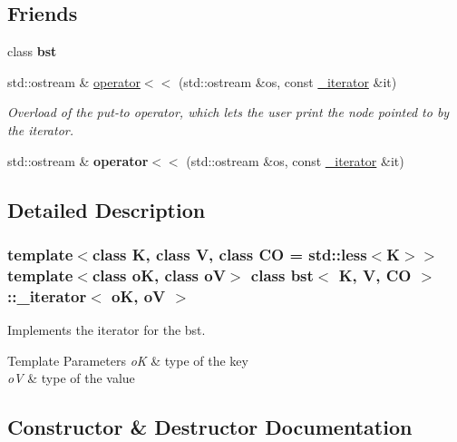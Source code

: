 \subsection*{Friends}
\begin{DoxyCompactItemize}
\item 
\mbox{\label{classbst_1_1__iterator_a6527b7edd158a9d9568888a83a53c54e}} 
class {\bfseries bst}
\item 
std\+::ostream \& \hyperlink{classbst_1_1__iterator_a517e7799c21cf88ce23e54c7f3f3896f}{operator$<$$<$} (std\+::ostream \&os, const \hyperlink{classbst_1_1__iterator}{\+\_\+iterator} \&it)
\begin{DoxyCompactList}\small\item\em Overload of the put-\/to operator, which lets the user print the node pointed to by the iterator. \end{DoxyCompactList}\item 
\mbox{\label{classbst_1_1__iterator_a517e7799c21cf88ce23e54c7f3f3896f}} 
std\+::ostream \& {\bfseries operator$<$$<$} (std\+::ostream \&os, const \hyperlink{classbst_1_1__iterator}{\+\_\+iterator} \&it)
\end{DoxyCompactItemize}


\subsection{Detailed Description}
\subsubsection*{template$<$class K, class V, class CO = std\+::less$<$\+K$>$$>$\newline
template$<$class oK, class oV$>$\newline
class bst$<$ K, V, C\+O $>$\+::\+\_\+iterator$<$ o\+K, o\+V $>$}

Implements the iterator for the bst. 


\begin{DoxyTemplParams}{Template Parameters}
{\em oK} & type of the key \\
\hline
{\em oV} & type of the value \\
\hline
\end{DoxyTemplParams}


\subsection{Constructor \& Destructor Documentation}
\mbox{\label{classbst_1_1__iterator_a9c4c33751d4d0a8484855b48acd730a2}} 
